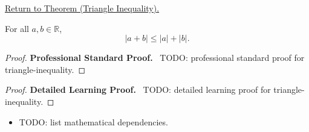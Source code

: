 \newpage
{}
\label{prf:triangle-inequality}

\begin{remark*}[Return]
\hyperref[thm:triangle-inequality]{Return to Theorem (Triangle Inequality).}
\end{remark*}

\begin{theorem*}
For all $a, b \in \mathbb{R}$,
\[
  \lvert a + b \rvert \le \lvert a \rvert + \lvert b \rvert.
\]
\end{theorem*}

\begin{proof}
\textbf{Professional Standard Proof.}~
TODO: professional standard proof for triangle-inequality.
\end{proof}

\begin{proof}
\textbf{Detailed Learning Proof.}~
TODO: detailed learning proof for triangle-inequality.
\end{proof}

\begin{remark*}
\end{remark*}

\begin{dependencies}
\begin{itemize}
  \item TODO: list mathematical dependencies.
\end{itemize}
\end{dependencies}

\clearpage
